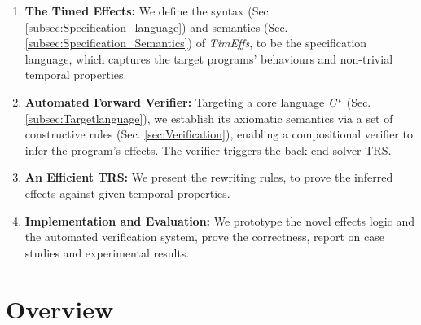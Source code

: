 \documentclass[acmsmall,10pt,review]{acmart}
\newcommand{\timedEffects}{\emph{TimEffs}}
\newcommand{\code}[1]{{\tt{\ensuremath{\m{#1}}}}}
\newcommand{\m}{\mathit}
\newcommand\secref[1]{Sec. \textcolor{black}{\ref{#1}}}
\newcommand{\timedL}{\code{C^{t}}}
\begin{document}
\begin{enumerate}
\item \textbf{The Timed Effects:} We define the syntax 
({\secref{subsec:Specification_language}}) and semantics 
({\secref{subsec:Specification_Semantics}}) of \timedEffects, to be the 
specification language, which captures the target programs' behaviours 
and non-trivial temporal properties.

\item \textbf{Automated Forward Verifier:} Targeting a core language 
\code{\timedL} ({\secref{subsec:Targetlanguage}}), we 
establish its axiomatic semantics via a set of constructive rules 
(\secref{sec:Verification}), enabling a compositional verifier to 
infer the program's effects. The verifier triggers the back-end 
solver TRS. 


\item \textbf{An Efficient TRS:}
We present the rewriting rules, to prove 
the inferred effects against given temporal properties. %


\item \textbf{Implementation and Evaluation:} We prototype the novel 
effects logic and the automated verification system, %
prove the correctness, report on case studies and experimental results. 


\end{enumerate} 




\section{Overview}\label{sec:Overview}
\end{document}
